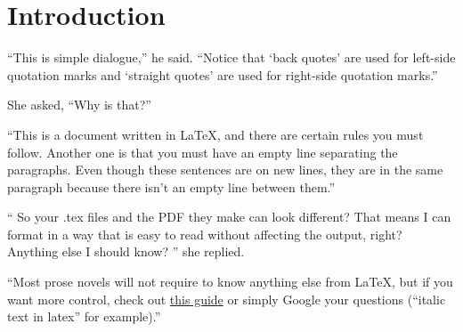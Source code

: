 \section*{Introduction}

``This is simple dialogue,'' he said. ``Notice that `back quotes' are used for left-side quotation marks and `straight quotes' are used for right-side quotation marks.''

She asked, ``Why is that?''

``This is a document written in \LaTeX, and there are certain rules you must follow.
Another one is that you must have an empty line separating the paragraphs.
Even though these sentences are on new lines, they are in the same paragraph because there isn't an empty line between them.''


``
    So your .tex files and the PDF they make can look different?
    That means I can format in a way that is easy to read without
    affecting the output, right? Anything else I should know?
''
she replied.



``Most prose novels will not require to know anything else from \LaTeX, but if you want more control, check out \href{http://www.maths.tcd.ie/~dwilkins/LaTeXPrimer/GSWLaTeX.pdf}{this guide} or simply Google your questions (``italic text in latex'' for example).''